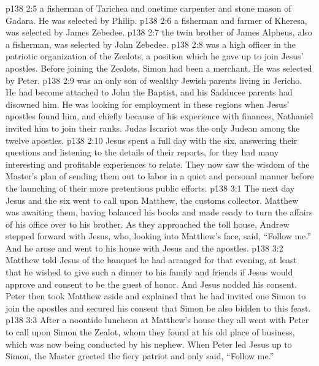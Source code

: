 \pc \vs p138 2:5 \bibnobreakspace {} a fisherman of Tarichea and onetime carpenter and stone mason of Gadara. He was selected by Philip.\plusone
\pc \vs p138 2:6 \bibnobreakspace {} a fisherman and farmer of Kheresa, was selected by James Zebedee.
\pc \vs p138 2:7 \bibnobreakspace {} the twin brother of James Alpheus, also a fisherman, was selected by John Zebedee.
\pc \vs p138 2:8 \bibnobreakspace {} was a high officer in the patriotic organization of the Zealots, a position which he gave up to join Jesus’ apostles. Before joining the Zealots, Simon had been a merchant. He was selected by Peter.
\pc \vs p138 2:9 \bibnobreakspace {} was an only son of wealthy Jewish parents living in Jericho. He had become attached to John the Baptist, and his Sadducee parents had disowned him. He was looking for employment in these regions when Jesus’ apostles found him, and chiefly because of his experience with finances, Nathaniel invited him to join their ranks. Judas Iscariot was the only Judean among the twelve apostles.
\pc \vs p138 2:10 Jesus spent a full day with the six, answering their questions and listening to the details of their reports, for they had many interesting and profitable experiences to relate. They now saw the wisdom of the Master’s plan of sending them out to labor in a quiet and personal manner before the launching of their more pretentious public efforts.
\vs p138 3:1 The next day Jesus and the six went to call upon Matthew, the customs collector. Matthew was awaiting them, having balanced his books and made ready to turn the affairs of his office over to his brother. As they approached the toll house, Andrew stepped forward with Jesus, who, looking into Matthew’s face, said, \textcolor{ubdarkred}{“Follow me.”} And he arose and went to his house with Jesus and the apostles.
\vs p138 3:2 Matthew told Jesus of the banquet he had arranged for that evening, at least that he wished to give such a dinner to his family and friends if Jesus would approve and consent to be the guest of honor. And Jesus nodded his consent. Peter then took Matthew aside and explained that he had invited one Simon to join the apostles and secured his consent that Simon be also bidden to this feast.
\pc \vs p138 3:3 After a noontide luncheon at Matthew’s house they all went with Peter to call upon Simon the Zealot, whom they found at his old place of business, which was now being conducted by his nephew. When Peter led Jesus up to Simon, the Master greeted the fiery patriot and only said, \textcolor{ubdarkred}{“Follow me.”}
